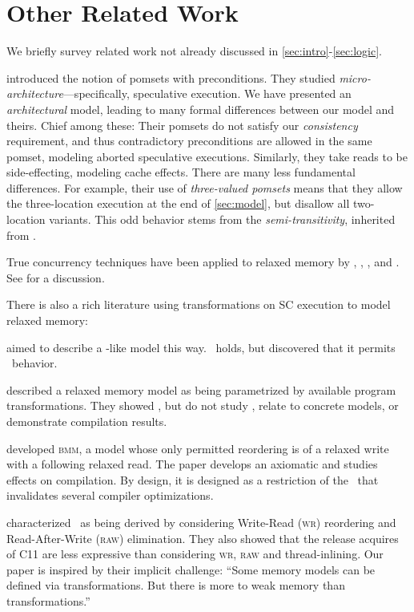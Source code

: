 \section{Other Related Work}\label{sec:ldrf}
We briefly survey related work not already discussed in
\textsection\ref{sec:intro}-\ref{sec:logic}.

\citet{2019-sp} introduced the notion of pomsets with preconditions.  They
studied \emph{micro\hyp{}architecture}---specifically, speculative execution.
We have presented an \emph{architectural} model, leading to many formal
differences between our model and theirs.  Chief among these: Their pomsets
do not satisfy our \emph{consistency} requirement, and thus contradictory
preconditions are allowed in the same pomset, modeling aborted speculative
executions.  Similarly, they take reads to be side\hyp{}effecting, modeling
cache effects.  There are many less fundamental differences.  For example,
their use of \emph{three-valued pomsets} means that they allow the
three-location execution at the end of \textsection\ref{sec:model}, but
disallow all two-location variants.  This odd behavior stems from the
\emph{semi-transitivity}, inherited from \citet{DBLP:journals/dc/Lamport86}.

True concurrency techniques have been applied to relaxed memory by
\citet{DBLP:conf/esop/CenciarelliKS07}, \citet{Castellan},
\citet{Pichon-Pharabod:2016:CSR:2837614.2837616}, and
\citet{DBLP:conf/cgo/ChakrabortyV17}.  See
\citet{DBLP:journals/lmcs/JeffreyR19} for a discussion.

There is also a rich literature using transformations on SC execution to
model relaxed memory:

\citet{Saraswat:2007:TMM:1229428.1229469}
aimed to describe a \jmm-like model this way.  \drfsc\ holds, but \citet{SP} 
discovered that it permits \oota\ behavior.

\citet{DBLP:conf/esop/FerreiraFS10} described a relaxed memory model as being
parametrized by available program transformations.  They showed \drfsc, but do not
study \oota, relate to concrete models, or demonstrate compilation results.

\citet{DBLP:conf/popl/DemangeLZJPV13} developed \textsc{bmm}, a model whose only
permitted reordering is of a relaxed write with a following relaxed read.
The paper develops an axiomatic and studies effects on compilation.  By
design, it is designed as a restriction of the \jmm\ that invalidates several
compiler optimizations.

\citet{DBLP:conf/fm/LahavV16} characterized \tso\ as being derived by
considering Write-Read (\textsc{wr}) reordering and Read-After-Write (\textsc{raw})
elimination.  They also showed that the release acquires of C11 are less
expressive than considering \textsc{wr}, \textsc{raw} and thread-inlining.  Our paper is
inspired by their implicit challenge: ``Some memory models can be defined via
transformations.  But there is more to weak memory than transformations.''

